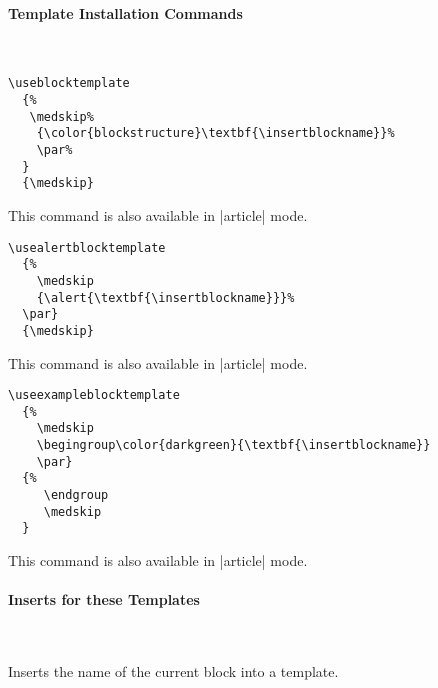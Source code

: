 \paragraph{Template Installation Commands}\

\begin{command}{\useblocktemplate{}}
  \example
\begin{verbatim}
\useblocktemplate
  {%
   \medskip%
    {\color{blockstructure}\textbf{\insertblockname}}%
    \par%
  }
  {\medskip}
\end{verbatim}

  \articlenote
  This command is also available in |article| mode.
\end{command}


\begin{command}{\usealertblocktemplate{}}
  \example
\begin{verbatim}
\usealertblocktemplate
  {%
    \medskip
    {\alert{\textbf{\insertblockname}}}%
  \par}
  {\medskip}
\end{verbatim}

  \articlenote
  This command is also available in |article| mode.
\end{command}


\begin{command}{\useexampleblocktemplate{}}
  \example
\begin{verbatim}
\useexampleblocktemplate
  {%
    \medskip
    \begingroup\color{darkgreen}{\textbf{\insertblockname}}
    \par}
  {%
     \endgroup
     \medskip
  }
\end{verbatim}

  \articlenote
  This command is also available in |article| mode.
\end{command}


\paragraph{Inserts for these Templates}\

\begin{command}{\insertblockname}
  Inserts the name of the current block into a template.
\end{command}



